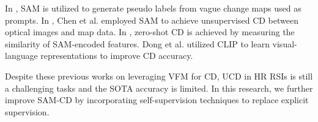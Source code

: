 In \cite{wang2023cs}, SAM is utilized to generate pseudo labels from vague change maps used as prompts. In \cite{chen2024change}, Chen et al. employed SAM to achieve unsupervised CD between optical images and map data. In \cite{zheng2024segment}, zero-shot CD is achieved by measuring the similarity of SAM-encoded features. Dong et al. \cite{dong2024changeclip} utilized CLIP to learn visual-language representations to improve CD accuracy.

Despite these previous works on leveraging VFM for CD, UCD in HR RSIs is still a challenging tasks and the SOTA accuracy is limited. In this research, we further improve SAM-CD by incorporating self-supervision techniques to replace explicit supervision.